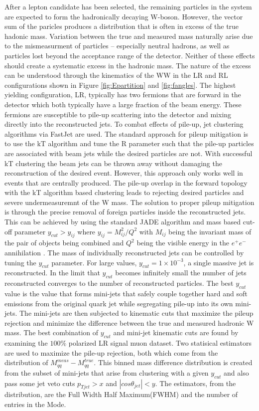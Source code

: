 After a lepton candidate has been selected, the remaining particles in the system are expected to form the hadronically decaying W-boson. However, the vector sum of the paricles  produces a distribution that is often in excess of the true hadonic mass. Variation between the true and measured mass naturally arise due to the mismeasurment of particles -- especially neutral hadrons, as well as particles lost beyond the acceptance range of the detector. Neither of these effects should create a systematic excess in the hadronic mass. The nature of the excess can be understood through the kinematics of the WW in the LR and RL configurations shown in Figure \ref{fig:Epartition} and \ref{fig:fangles}. The highest yielding configuration, LR, typically has two fermions that are forward in the detector which both typically have a large fraction of the beam energy. These fermions are susceptible to pile-up scattering into the detector and mixing directly into the reconstructed jets. To combat effects of pile-up, jet clustering algorithms via FastJet\cite{fastjet} are used.  The standard approach for pileup mitigation is to use the kT algorithm\cite{kt} and tune the R parameter such that the pile-up particles are associated with beam jets while the desired particles are not. With successful kT clustering the beam jets can be thrown away without damaging the reconstruction of the desired event. However, this approach only works well in events that are centrally produced.  The pile-up overlap in the forward topology with the kT algorithm  based clustering leads to rejecting desired particles and severe undermeasuremnt of the W mass. The solution to proper pileup mitigation is through the precise removal of foreign particles inside the reconstructed jets.  This can be achieved by using the standard JADE algorithm and mass based cut-off parameter $y_{cut} > y_{ij}$ where $y_{ij} = M_{ij}^2 / Q^2$ with $M_{ij}$ being the invariant mass of the pair of objects being combined and $Q^2$ being the visible energy in the $e^{+}e^{-}$ annihilation \cite{ycut}.  The mass of individually reconstructed jets can be controlled by tuning the $y_{cut}$ parameter. For large values, $y_{cut} =1\times10^{-3}$, a single massive jet is reconstructed. In the limit that $y_{cut}$ becomes infinitely small the number of jets reconstructed converges to the number of reconstructed particles.  The best $y_{cut}$ value is the value that forms mini-jets that safely couple together hard and soft emissions from  the original quark jet while segregating pile-up into its own mini-jets. The mini-jets are then subjected to kinematic cuts that maximize the pileup rejection and minimize the difference  between the true and measured hadronic W mass. 	The best combination of $y_{cut}$ and mini-jet kinematic cuts are found by examining the $100\%$ polarized LR signal muon dataset.  Two statisical estimators are used to maximize the pile-up rejection, both which come from the distribution of $M_{qq}^{meas} - M_{qq}^{true}$. This binned mass difference distribution is created from the subset of mini-jets that arise from clustering with a given $y_{cut}$ and also pass some jet veto cuts $p_{Tjet} > x$ and $|cos\theta_{jet}| < y$. The estimators, from the distribution, are the Full Width Half Maximum(FWHM) and the number of entries in the Mode.  
